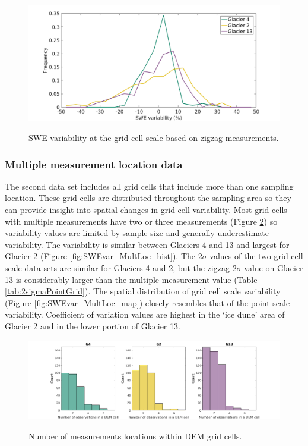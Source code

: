 \documentclass{sfuthesis}
\begin{document}
\begin{figure}[H]
	\centering
	\includegraphics[width =\textwidth]{ZigzagPDF_G.png}\\
	\caption{SWE variability at the grid cell scale based on zigzag measurements.}
	\label{fig:SWEvar_ZZG_hist}
\end{figure}

\subsubsection{Multiple measurement location data}
The second data set includes all grid cells that include more than one sampling location. These grid cells are distributed throughout the sampling area so they can provide insight into spatial changes in grid cell variability. Most grid cells with multiple measurements have two or three measurements (Figure \ref{fig:NumObsPerCell}) so variability values are limited by sample size and generally underestimate variability. The variability is similar between Glaciers 4 and 13 and largest for Glacier 2 (Figure \ref{fig:SWEvar_MultLoc_hist}). The $2\sigma$ values of the two grid cell scale  data sets are similar for Glaciers 4 and 2, but the zigzag $2\sigma$ value on Glacier 13 is considerably larger than the multiple measurement value (Table  \ref{tab:2sigmaPointGrid}). The spatial distribution of grid cell scale variability (Figure \ref{fig:SWEvar_MultLoc_map}) closely resembles that of the point scale variability. Coefficient of variation values are highest in the `ice dune' area of Glacier 2 and in the lower portion of Glacier 13.  

\begin{figure}[H]
	\centering
	\includegraphics[width =\textwidth]{NumObsPerCell.png}\\
	\caption{Number of measurements locations within DEM grid cells.}
	\label{fig:NumObsPerCell}
\end{figure}
\end{document}
